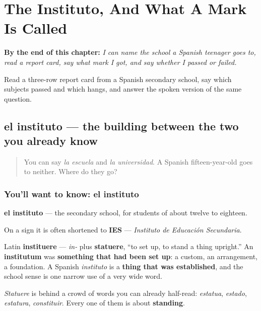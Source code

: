 
\chapter{The Instituto, And What A Mark Is Called}
\label{ch:instituto-y-nota}

\begin{chapteropening}
\textbf{By the end of this chapter:} \emph{I can name the school a Spanish teenager goes to, read a report card, say what mark I got, and say whether I passed or failed.}

Read a three-row report card from a Spanish secondary school, say which subjects passed and which hangs, and answer the spoken version of the same question.
\end{chapteropening}

\section[el instituto]{el instituto — the building between the two you already know}

\label{lesson:ES-C429-instituto}



\begin{quote}
You can say \emph{la escuela} and \emph{la universidad}. A Spanish fifteen-year-old goes to neither. Where do they go?
\end{quote}

\subsection*{You'll want to know: el instituto}
\textbf{el instituto} — the secondary school, for students of about twelve to eighteen.

On a sign it is often shortened to \textbf{IES} — \emph{Instituto de Educación Secundaria}.

\begin{cousinweb}
Latin \textbf{instituere} — \emph{in-} plus \textbf{statuere}, \textquotedblleft{}to set up, to stand a thing upright.\textquotedblright{} An \textbf{institutum} was \textbf{something that had been set up}: a custom, an arrangement, a foundation. A Spanish \emph{instituto} is a \textbf{thing that was established}, and the school sense is one narrow use of a very wide word.

\emph{Statuere} is behind a crowd of words you can already half-read: \emph{estatua}, \emph{estado}, \emph{estatura}, \emph{constituir}. Every one of them is about \textbf{standing}.
\end{cousinweb}

